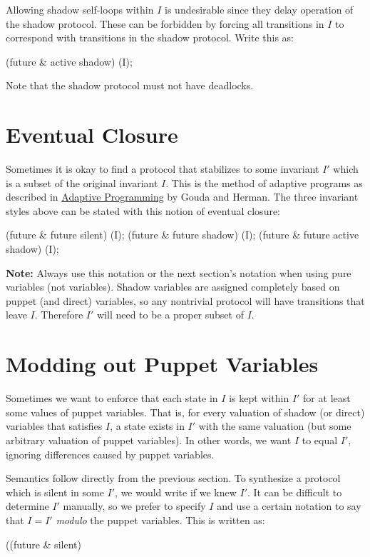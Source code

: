 Allowing shadow self-loops within $I$ is undesirable since they delay operation of the shadow protocol.
These can be forbidden by forcing all transitions in $I$ to correspond with transitions in the shadow protocol.
Write this as:
\begin{code}
(future & active shadow) (I);
\end{code}
Note that the shadow protocol must not have deadlocks.


\section{Eventual Closure}

Sometimes it is okay to find a protocol that stabilizes to some invariant $I'$ which is a subset of the original invariant $I$.
This is the method of adaptive programs as described in \href{http://dx.doi.org/10.1109/32.92911}{Adaptive Programming} by Gouda and Herman.
The three invariant styles above can be stated with this notion of eventual closure:
\begin{code}
(future & future silent) (I);
(future & future shadow) (I);
(future & future active shadow) (I);
\end{code}

\textbf{Note:} Always use this notation or the next section's notation when using pure  variables (not  variables).
Shadow variables are assigned completely based on puppet (and direct) variables, so any nontrivial protocol will have transitions that leave $I$.
Therefore $I'$ will need to be a proper subset of $I$.


\section{Modding out Puppet Variables}

Sometimes we want to enforce that each state in $I$ is kept within $I'$ for at least some values of puppet variables.
That is, for every valuation of shadow (or direct) variables that satisfies $I$, a state exists in $I'$ with the same valuation (but some arbitrary valuation of puppet variables).
In other words, we want $I$ to equal $I'$, ignoring differences caused by puppet variables.

Semantics follow directly from the previous section.
To synthesize a protocol which is silent in some $I'$, we would write  if we knew $I'$.
It can be difficult to determine $I'$ manually, so we prefer to specify $I$ and use a certain notation to say that $I=I'$ \textit{modulo} the puppet variables.
This is written as:
\begin{code}
((future & silent) %
\end{code}

